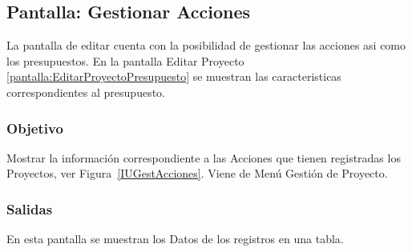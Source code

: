 \subsection{Pantalla: Gestionar Acciones}\label{pantalla:EditarProyectoAccion}
La pantalla de editar cuenta con la posibilidad de gestionar las acciones asi como los presupuestos. En la pantalla Editar Proyecto \ref{pantalla:EditarProyectoPresupuesto} se muestran las caracteristicas correspondientes al presupuesto.

\subsubsection{Objetivo}
  Mostrar la información correspondiente a las Acciones que tienen registradas los Proyectos, ver Figura~\ref{IUGestAcciones}. Viene de Menú Gestión de Proyecto.


\subsubsection{Salidas}
  En esta pantalla se muestran los Datos de los  registros en una tabla.

